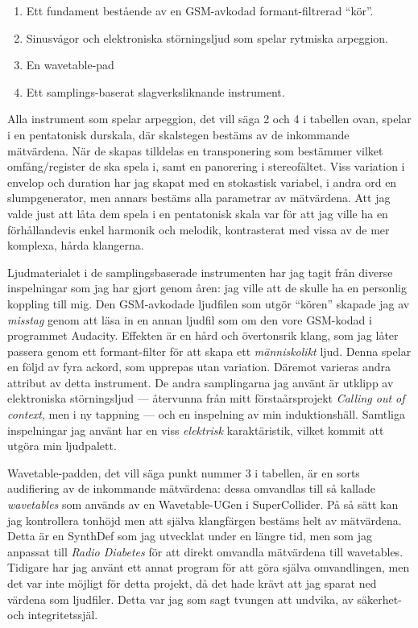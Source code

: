 \documentclass[11pt, a4paper]{article} %
\begin{document}
  \begin{enumerate}
	\item Ett fundament bestående av en GSM-avkodad formant-filtrerad ``kör''.
	\item Sinusvågor och elektroniska störningsljud som spelar rytmiska arpeggion.
	\item En wavetable-pad
	\item Ett samplings-baserat slagverksliknande instrument.
  \end{enumerate}

Alla instrument som spelar arpeggion, det vill säga 2 och 4 i tabellen ovan, spelar i en pentatonisk durskala, där skalstegen bestäms av de inkommande mätvärdena. När de skapas tilldelas en transponering som bestämmer vilket omfång/register de ska spela i, samt en panorering i stereofältet. Viss variation i envelop och duration har jag skapat med en stokastisk variabel, i andra ord en slumpgenerator, men annars bestäms alla parametrar av mätvärdena. Att jag valde just att låta dem spela i en pentatonisk skala var för att jag ville ha en förhållandevis enkel harmonik och melodik, kontrasterat med vissa av de mer komplexa, hårda klangerna. 

Ljudmaterialet i de samplingsbaserade instrumenten har jag tagit från diverse inspelningar som jag har gjort genom åren: jag ville att de skulle ha en personlig koppling till mig. Den GSM-avkodade ljudfilen som utgör ``kören'' skapade jag av \emph{misstag} genom att läsa in en annan ljudfil som om den vore GSM-kodad i programmet Audacity. Effekten är en hård och övertonsrik klang, som jag låter passera genom ett formant-filter för att skapa ett \emph{människolikt} ljud. Denna spelar en följd av fyra ackord, som upprepas utan variation. Däremot varieras andra attribut av detta instrument. De andra samplingarna jag använt är utklipp av elektroniska störningsljud --- återvunna från mitt förstaårsprojekt \emph{Calling out of context}, men i ny tappning --- och en inspelning av min induktionshäll. Samtliga inspelningar jag använt har en viss \emph{elektrisk} karaktäristik, vilket kommit att utgöra min ljudpalett. 

Wavetable-padden, det vill säga punkt nummer 3 i tabellen, är en sorts audifiering av de inkommande mätvärdena: dessa omvandlas till så kallade \emph{wavetables} som används av en Wavetable-UGen i SuperCollider. På så sätt kan jag kontrollera tonhöjd men att själva klangfärgen bestäms helt av mätvärdena. Detta är en SynthDef som jag utvecklat under en längre tid, men som jag anpassat till \emph{Radio Diabetes} för att direkt omvandla mätvärdena till wavetables. Tidigare har jag använt ett annat program för att göra själva omvandlingen, men det var inte möjligt för detta projekt, då det hade krävt att jag sparat ned värdena som ljudfiler. Detta var jag som sagt tvungen att undvika, av säkerhet- och integritetssjäl.
\end{document}

